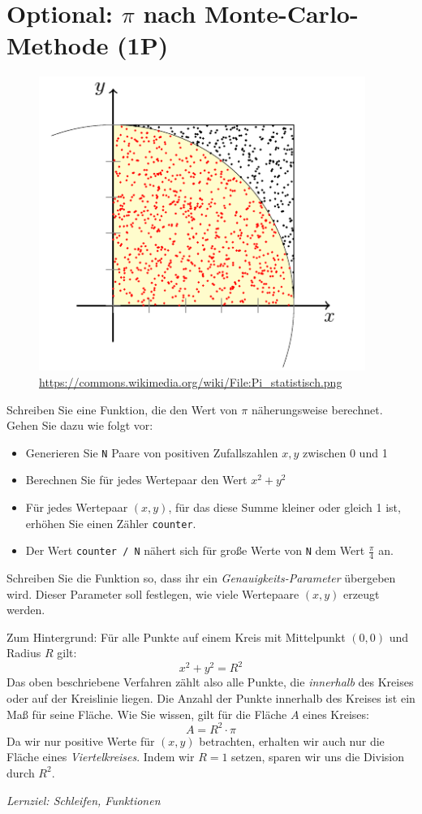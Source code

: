 \documentclass[
	ngerman,
	fontsize=10pt,
	parskip=half,
	titlepage=true,
	DIV=12
]{scrartcl}
\begin{document}
\section{Optional: $\pi$ nach Monte-Carlo-Methode (1P)}
\begin{figure}
\vspace{-20pt}
\includegraphics[width=\linewidth]{MCarlo}
\caption{\url{https://commons.wikimedia.org/wiki/File:Pi_statistisch.png}}
\vspace{-20pt}
\end{figure}
%
Schreiben Sie eine Funktion, die den Wert von $\pi$ näherungsweise berechnet. Gehen Sie dazu wie folgt vor:
\begin{itemize}
\item Generieren Sie \texttt{N} Paare von positiven Zufallszahlen $x, y$ zwischen 0 und 1
\item Berechnen Sie für jedes Wertepaar den Wert $x^2 + y^2$
\item Für jedes Wertepaar $(x, y)$, für das diese Summe kleiner oder gleich 1 ist, erhöhen Sie einen
	Zähler \texttt{counter}.
\item Der Wert \texttt{counter / N} nähert sich für große Werte von \texttt{N} dem Wert $\frac{\pi}{4}$
	an.
\end{itemize}

Schreiben Sie die Funktion so, dass ihr ein \emph{Genauigkeits-Parameter} übergeben wird. Dieser Parameter soll festlegen, wie viele Wertepaare $(x, y)$ erzeugt werden.

Zum Hintergrund:\newline
Für alle Punkte auf einem Kreis mit Mittelpunkt $(0,0)$ und Radius $R$ gilt:
\[ x^2 + y^2 = R^2\]
Das oben beschriebene Verfahren zählt also alle Punkte, die \emph{innerhalb} des Kreises oder auf der Kreislinie liegen. Die Anzahl der Punkte innerhalb des Kreises ist ein Maß für seine Fläche. Wie Sie wissen, gilt für die Fläche $A$ eines Kreises:
\[ A = R^2 \cdot \pi \]
Da wir nur positive Werte für $(x, y)$ betrachten, erhalten wir auch nur die Fläche eines \emph{Viertelkreises}. Indem wir $R=1$ setzen, sparen wir uns die Division durch $R^2$.

\emph{Lernziel: Schleifen, Funktionen}
\end{document}
